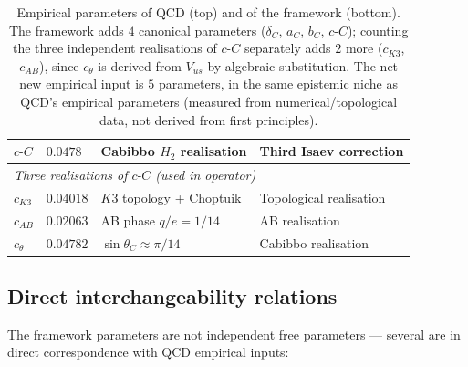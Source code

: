 \documentclass[11pt,a4paper]{article}
\newcommand{\dC}{\delta_C}
\newcommand{\cC}{c\text{-}C}
\theoremstyle{plain}
\theoremstyle{definition}
\theoremstyle{remark}
\begin{document}
\begin{table}[h]
\begin{tabular}{l l l l}
$\cC$                 & $0.0478$           & Cabibbo $H_2$ realisation  & Third Isaev correction \\
\midrule
\multicolumn{4}{l}{\emph{Three realisations of $\cC$ (used in operator)}} \\
$c_{K3}$              & $0.04018$          & $K3$ topology + Choptuik   & Topological realisation \\
$c_{AB}$              & $0.02063$          & AB phase $q/e = 1/14$      & AB realisation \\
$c_\theta$            & $0.04782$          & $\sin\theta_C \approx \pi/14$ & Cabibbo realisation \\
\bottomrule
\end{tabular}
\caption{Empirical parameters of QCD (top) and of the framework
(bottom).  The framework adds $4$ canonical parameters ($\dC$,
$a_C$, $b_C$, $\cC$); counting the three independent realisations
of $\cC$ separately adds $2$ more ($c_{K3}$, $c_{AB}$), since
$c_\theta$ is derived from $V_{us}$ by algebraic substitution.
The net new empirical input is $5$ parameters, in the same
epistemic niche as QCD's empirical parameters (measured from
numerical/topological data, not derived from first principles).}
\label{tab:epistemic-parity}
\end{table}

\subsection{Direct interchangeability relations}

The framework parameters are not independent free parameters ---
several are in direct correspondence with QCD empirical inputs:
\end{document}
